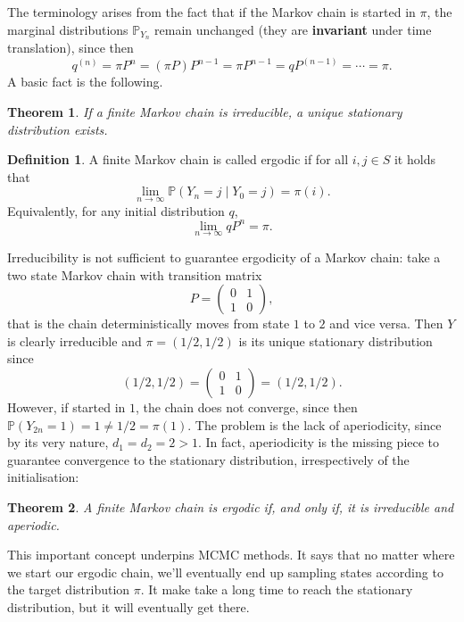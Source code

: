 \documentclass[
]{book}
\newtheorem{theorem}{Theorem}[chapter]
\theoremstyle{definition}
\newtheorem{definition}{Definition}[chapter]
\theoremstyle{definition}
\theoremstyle{definition}
\theoremstyle{definition}
\theoremstyle{remark}
\begin{document}
The terminology arises from the fact that if the Markov chain is started in \(\pi\), the marginal distributions \(\mathbb{P}_{Y_n}\) remain unchanged (they are \textbf{invariant} under time translation), since then 
\[q^{(n)} = \pi P^n = (\pi P)P^{n-1} = \pi P^{n-1} = qP^{(n-1)} = \cdots = \pi.\]
 A basic fact is the following. 

\begin{theorem} 
If a finite Markov chain is irreducible, a unique stationary distribution exists.
\end{theorem}

\begin{definition} 
	A  finite Markov chain is called ergodic if for all  \(i,j \in S\) it holds that 
	\[\lim_{n \to \infty} \mathbb{P}(Y_n = j \mid Y_0 = j) = \pi(i).\] 
	Equivalently,  for any initial distribution $q$, 
	\[\lim_{n \to \infty} qP^n = \pi.\]
\end{definition}

Irreducibility is not sufficient to guarantee ergodicity of a Markov chain: take a two state Markov chain with transition matrix 
\[P = \begin{pmatrix} 0 & 1\\ 1 & 0 \end{pmatrix},\]
that is the chain deterministically moves from state $1$ to $2$ and vice versa. Then \(Y\) is clearly irreducible and \(\pi = (1/2,1/2)\) is its unique stationary distribution since  
\[(1/2, 1/2) =  \begin{pmatrix} 0 & 1\\ 1 & 0 \end{pmatrix} = (1/2,1/2).\]
However, if started in $1$, the chain does not converge, since then \(\mathbb{P}(Y_{2n} = 1) = 1 \neq 1/2 = \pi(1). \) The problem  is the lack of aperiodicity, since by its very nature, \(d_1 = d_2 = 2 > 1\). In fact, aperiodicity is the missing piece to guarantee convergence to the stationary distribution, irrespectively of the initialisation: 


\begin{theorem} 
A finite Markov chain is ergodic if, and only if, it is irreducible and aperiodic.
\end{theorem}
 

This important concept underpins MCMC methods. It says that no matter where we start our ergodic chain, we'll eventually end up sampling states according to the target distribution \(\pi\). It make take a long time to reach the stationary distribution, but it will eventually get there.
\end{document}
